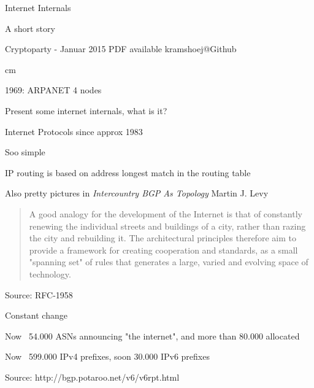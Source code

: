 \documentclass[20pt,landscape,a4paper,footrule]{foils}
\begin{document}


\mytitlepage
{Internet Internals

A short story}

\centerline{\footnotesize Cryptoparty - Januar 2015
 PDF available kramshoej@Github}

\LogoOn



 cm


\centerline{1969: ARPANET 4 nodes}


\begin{list1}
\item Present some internet internals, what is it?
\end{list1}


\vskip 1cm
\centerline{Internet Protocols since approx 1983}



\centerline{Soo simple \smiley}

\vskip 1cm
IP routing is based on address longest match in the routing table



Also pretty pictures in \emph{Intercountry BGP As Topology} Martin J. Levy\\




\begin{quote}
 A good analogy for the development of the Internet is that of
 constantly renewing the individual streets and buildings of a city,
 rather than razing the city and rebuilding it. The architectural
 principles therefore aim to provide a framework for creating
 cooperation and standards, as a small "spanning set" of rules that
 generates a large, varied and evolving space of technology.
\end{quote}
Source: RFC-1958

\begin{list2}
\item Constant change
\item Now ~54.000 ASNs announcing "the internet", and more than 80.000 allocated
\item Now ~599.000 IPv4 prefixes, soon 30.000 IPv6 prefixes
\item Source: http://bgp.potaroo.net/v6/v6rpt.html
\end{list2}
\end{document}
